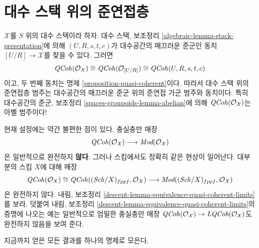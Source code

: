 \section{대수 스택 위의 준연접층}
\label{section-quasi-coherent-algebraic-stacks}

\noindent
$\mathcal{X}$를 $S$ 위의 대수 스택이라 하자.
대수 스택, 보조정리 \ref{algebraic-lemma-stack-presentation}에 의해
$(U, R, s, t, c)$가 대수공간의 매끄러운 준군인 동치
$[U/R] \to \mathcal{X}$를 찾을 수 있다. 그러면
$$
\mathit{QCoh}(\mathcal{O}_\mathcal{X})
\cong
\mathit{QCoh}(\mathcal{O}_{[U/R]})
\cong
\mathit{QCoh}(U, R, s, t, c)
$$
이고, 두 번째 동치는 명제 \ref{proposition-quasi-coherent}이다.
따라서 대수 스택 위의 준연접층 범주는 대수공간의 매끄러운 준군
위의 준연접 가군 범주와 동치이다. 특히 대수공간의 준군, 보조정리
\ref{spaces-groupoids-lemma-abelian}에 의해
$\mathit{QCoh}(\mathcal{O}_\mathcal{X})$는 아벨 범주이다!

\medskip\noindent
현재 설정에는 약간 불편한 점이 있다. 충실충만 매장
$$
\mathit{QCoh}(\mathcal{O}_\mathcal{X})
\longrightarrow
\textit{Mod}(\mathcal{O}_\mathcal{X})
$$
은 일반적으로 완전하지 {\bf 않다}. 그러나 스킴에서도 정확히 같은
현상이 일어난다. 대부분의 스킴 $X$에 대해 매장
$$
\mathit{QCoh}(\mathcal{O}_X) \cong
\mathit{QCoh}((\mathit{Sch}/X)_{fppf}, \mathcal{O}_X) \longrightarrow
\textit{Mod}((\mathit{Sch}/X)_{fppf}, \mathcal{O}_X)
$$
은 완전하지 않다. 내림, 보조정리
\ref{descent-lemma-equivalence-quasi-coherent-limits}를 보라.
덧붙여 내림, 보조정리
\ref{descent-lemma-equivalence-quasi-coherent-limits}의 증명에 나오는
예는 일반적으로 엄밀한 충실충만 매장
$\mathit{QCoh}(\mathcal{O}_\mathcal{X}) \to
\textit{LQCoh}(\mathcal{O}_\mathcal{X})$도 완전하지 않음을 보여 준다.

\medskip\noindent
지금까지 얻은 모든 결과를 하나의 명제로 모은다.

